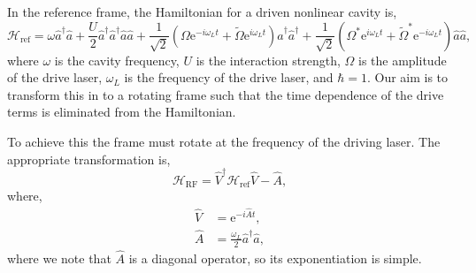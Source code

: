 In the reference frame, the Hamiltonian for a driven nonlinear cavity is,
\begin{equation}
	\mathcal{H}_{\mathrm{ref}} = \omega\hat{a}^{\dagger}\hat{a} + \frac{U}{2}\hat{a}^{\dagger}\hat{a}^{\dagger}\hat{a}\hat{a} + \frac{1}{\sqrt{2}} \left(\Omega\mathrm{e}^{-i\omega_{L}t} + \tilde{\Omega}\mathrm{e}^{i\omega_{L}t}\right) \hat{a}^{\dagger}\hat{a}^{\dagger} + \frac{1}{\sqrt{2}} \left( \Omega^{*}\mathrm{e}^{i\omega_{L}t} + \tilde{\Omega}^{*}\mathrm{e}^{-i\omega_{L}t} \right)\hat{a}\hat{a},
	\label{eq:rot1}
\end{equation}
where \(\omega\) is the cavity frequency, \(U\) is the interaction strength, \(\Omega\) is the amplitude of the drive laser, \(\omega_{L}\) is the frequency of the drive laser, and \(\hbar = 1\). Our aim is to transform this in to a rotating frame such that the time dependence of the drive terms is eliminated from the Hamiltonian.

To achieve this the frame must rotate at the frequency of the driving laser. The appropriate transformation is,
\begin{equation}
	\mathcal{H}_{\mathrm{RF}} = \hat{V}^{\dagger}\mathcal{H}_{\mathrm{ref}}\hat{V} - \hat{A},
	\label{eq:rot2}
\end{equation}
where,
\begin{align}
	\hat{V} &= \mathrm{e}^{-i\hat{A}t}, \label{eq:rot3} \\
	\hat{A} &= \frac{\omega_{L}}{2} \hat{a}^{\dagger}\hat{a}, \label{eq:rot4}
\end{align}
where we note that \(\hat{A}\) is a diagonal operator, so its exponentiation is simple.
	